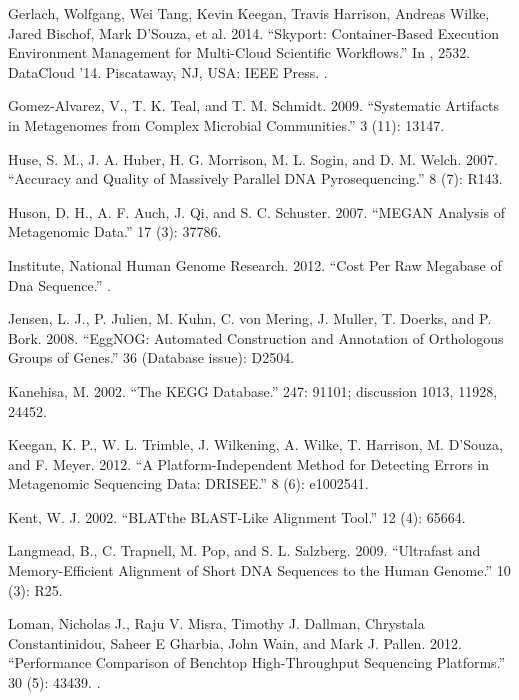 \documentclass[letterpaper,10pt,english]{sphinxmanual}
\begin{document}
Gerlach, Wolfgang, Wei Tang, Kevin Keegan, Travis Harrison,
Andreas Wilke, Jared Bischof, Mark D’Souza, et al. 2014. “Skyport:
Container-Based Execution Environment Management for Multi-Cloud
Scientific Workflows.” In , 25\textendash{}32.
DataCloud ’14. Piscataway, NJ, USA: IEEE Press.
.

Gomez-Alvarez, V., T. K. Teal, and T. M. Schmidt. 2009.
“Systematic Artifacts in Metagenomes from Complex Microbial
Communities.”  3 (11): 1314\textendash{}7.

Huse, S. M., J. A. Huber, H. G. Morrison, M. L. Sogin, and D. M.
Welch. 2007. “Accuracy and Quality of Massively Parallel DNA
Pyrosequencing.”  8 (7): R143.

Huson, D. H., A. F. Auch, J. Qi, and S. C. Schuster. 2007. “MEGAN
Analysis of Metagenomic Data.”  17 (3): 377\textendash{}86.

Institute, National Human Genome Research. 2012. “Cost Per Raw
Megabase of Dna Sequence.”
.

Jensen, L. J., P. Julien, M. Kuhn, C. von Mering, J. Muller, T.
Doerks, and P. Bork. 2008. “EggNOG: Automated Construction and
Annotation of Orthologous Groups of Genes.”  36
(Database issue): D250\textendash{}4.

Kanehisa, M. 2002. “The KEGG Database.”  247:
91\textendash{}101; discussion 101\textendash{}3, 119\textendash{}28, 244\textendash{}52.

Keegan, K. P., W. L. Trimble, J. Wilkening, A. Wilke, T. Harrison,
M. D’Souza, and F. Meyer. 2012. “A Platform-Independent Method for
Detecting Errors in Metagenomic Sequencing Data: DRISEE.”  8 (6): e1002541.

Kent, W. J. 2002. “BLAT\textendash{}the BLAST-Like Alignment Tool.”  12 (4): 656\textendash{}64.

Langmead, B., C. Trapnell, M. Pop, and S. L. Salzberg. 2009.
“Ultrafast and Memory-Efficient Alignment of Short DNA Sequences
to the Human Genome.”  10 (3): R25.

Loman, Nicholas J., Raju V. Misra, Timothy J. Dallman, Chrystala
Constantinidou, Saheer E Gharbia, John Wain, and Mark J. Pallen.
2012. “Performance Comparison of Benchtop High-Throughput
Sequencing Platforms.”  30 (5): 434\textendash{}39.
.
\end{document}
